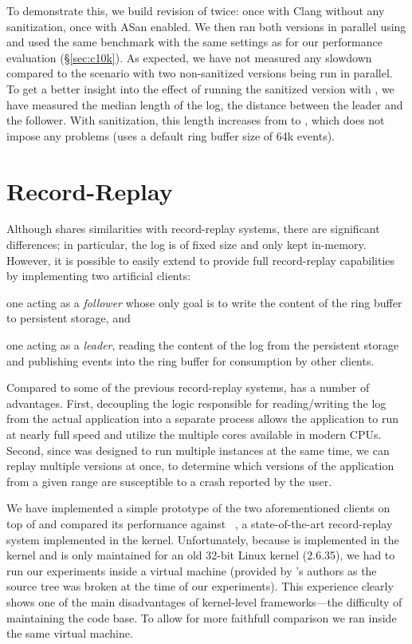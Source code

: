 To demonstrate this, we build revision  of \redis twice:
once with Clang without any sanitization, once with ASan enabled.  We
then ran both versions in parallel using \varan and used the same
benchmark with the same settings as for our performance evaluation
(\S\ref{sec:c10k}). As expected, we have not measured any slowdown
compared to the scenario with two non-sanitized versions being run in
parallel. To get a better insight into the effect of running the
sanitized version with \varan, we have measured the median length of
the log, \ie the distance between the leader and the follower. With
sanitization, this length increases from
\redisNoSanitizationMedianLength to \redisSanitizationMedianLength,
which does not impose any problems (\varan uses a default ring buffer
size of 64k events).

\section{Record-Replay}
\label{sec:record_replay}

Although \nx shares similarities with record-replay systems, there are
significant differences; in particular, the log is of fixed size and
only kept in-memory.  However, it is possible to easily extend \nx to
provide full record-replay capabilities by implementing two artificial
clients:
\begin{inparaenum}[(i)]
\item one acting as a \emph{follower} whose only goal is to write the
  content of the ring buffer to persistent storage, and
\item one acting as a \emph{leader}, reading the content of the log
  from the persistent storage and publishing events into the ring
  buffer for consumption by other clients.
\end{inparaenum}

Compared to some of the previous record-replay systems, \varan has a
number of advantages. First, decoupling the logic responsible for
reading/writing the log from the actual application into a separate
process allows the application to run at nearly full speed and utilize
the multiple cores available in modern CPUs.  Second, since \nx was
designed to run multiple instances at the same time, we can replay
multiple versions at once, \eg to determine which versions of the
application from a given range are susceptible to a crash reported by
the user.

We have implemented a simple prototype of the two aforementioned
clients on top of \nx and compared its performance against
\scribe~\cite{scribe}, a state-of-the-art record-replay system
implemented in the kernel.  Unfortunately, because \scribe is
implemented in the kernel and is only maintained for an old 32-bit
Linux kernel (2.6.35), we had to run our experiments inside a virtual
machine (provided by \scribe's authors as the source tree was broken
at the time of our experiments). This experience clearly shows one of
the main disadvantages of kernel-level frameworks---the difficulty of
maintaining the code base. To allow for more faithfull comparison we
ran \nx inside the same virtual machine.

